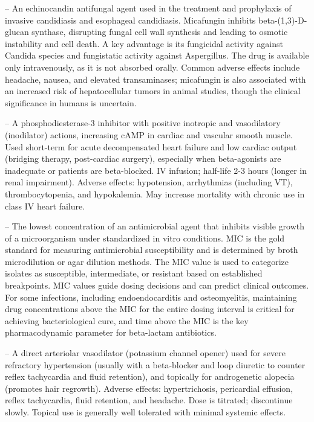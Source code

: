 -- An echinocandin antifungal agent used in the treatment and prophylaxis of invasive candidiasis and esophageal candidiasis. Micafungin inhibits beta-(1,3)-D-glucan synthase, disrupting fungal cell wall synthesis and leading to osmotic instability and cell death. A key advantage is its fungicidal activity against Candida species and fungistatic activity against Aspergillus. The drug is available only intravenously, as it is not absorbed orally. Common adverse effects include headache, nausea, and elevated transaminases; micafungin is also associated with an increased risk of hepatocellular tumors in animal studies, though the clinical significance in humans is uncertain.

-- A phosphodiesterase-3 inhibitor with positive inotropic and vasodilatory (inodilator) actions, increasing cAMP in cardiac and vascular smooth muscle. Used short-term for acute decompensated heart failure and low cardiac output (bridging therapy, post-cardiac surgery), especially when beta-agonists are inadequate or patients are beta-blocked. IV infusion; half-life 2-3 hours (longer in renal impairment). Adverse effects: hypotension, arrhythmias (including VT), thrombocytopenia, and hypokalemia. May increase mortality with chronic use in class IV heart failure.

-- The lowest concentration of an antimicrobial agent that inhibits visible growth of a microorganism under standardized in vitro conditions. MIC is the gold standard for measuring antimicrobial susceptibility and is determined by broth microdilution or agar dilution methods. The MIC value is used to categorize isolates as susceptible, intermediate, or resistant based on established breakpoints. MIC values guide dosing decisions and can predict clinical outcomes. For some infections, including endoendocarditis and osteomyelitis, maintaining drug concentrations above the MIC for the entire dosing interval is critical for achieving bacteriological cure, and time above the MIC is the key pharmacodynamic parameter for beta-lactam antibiotics.

-- A direct arteriolar vasodilator (potassium channel opener) used for severe refractory hypertension (usually with a beta-blocker and loop diuretic to counter reflex tachycardia and fluid retention), and topically for androgenetic alopecia (promotes hair regrowth). Adverse effects: hypertrichosis, pericardial effusion, reflex tachycardia, fluid retention, and headache. Dose is titrated; discontinue slowly. Topical use is generally well tolerated with minimal systemic effects.

